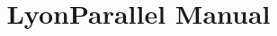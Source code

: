 \documentclass[a4paper]{article}
\begin{document}
  
    
\title{LyonParallel Manual}
\maketitle
\tableofcontents  
\newpage  


\printbibliography 
\printindex
\end{document}
